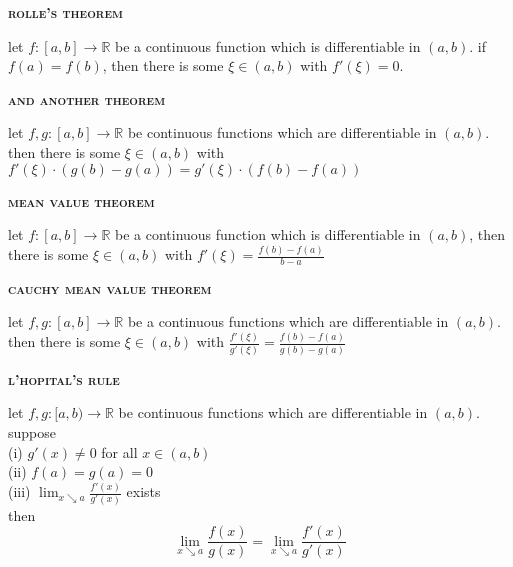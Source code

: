 \documentclass[a4paper]{article}
\begin{document}
\begin{multicols}{2}
\begin{framed}
	\begin{center}
		\textbf{\textsc{rolle's theorem}}
	\end{center}
	let $f:[a,b] \rightarrow \mathbb{R}$ be a continuous function which is differentiable in $(a,b)$. if
$f(a) = f(b)$, then there is some $\xi \in (a,b)$ with $f'(\xi) = 0$.
\end{framed}

\begin{framed}
	\begin{center}
		\textbf{\textsc{and another theorem}}
	\end{center}
	let $f,g: [a,b] \rightarrow \mathbb{R}$ be continuous functions which are differentiable in $(a, b)$. then there is some $\xi \in (a, b)$ with
	$f′(\xi) \cdot (g(b) − g(a)) = g′(\xi) \cdot (f(b) − f(a))$
\end{framed}

\begin{framed}
	\begin{center}
		\textbf{\textsc{mean value theorem}}
	\end{center}
	let $f:[a, b] \rightarrow \mathbb{R}$ be a continuous function which is differentiable in $(a, b)$, then there is some $\xi \in (a, b)$ with $f'(\xi) = \frac{f(b) - f(a)}{b - a}$
\end{framed}

\begin{framed}
	\begin{center}
		\textbf{\textsc{cauchy mean value theorem}}
	\end{center}
	let $f,g :[a, b] \rightarrow \mathbb{R}$ be a continuous functions which are differentiable in $(a, b)$. then there is some $\xi \in (a, b)$ with $\frac{f'(\xi)}{g'(\xi)} = \frac{f(b) - f(a)}{g(b) - g(a)}$
\end{framed}

\begin{framed}
	\begin{center}
		\textbf{\textsc{l'hopital's rule}}
	\end{center}
	let $f,g:[a, b) \rightarrow \mathbb{R}$ be continuous functions which are differentiable in $(a, b)$. suppose\\
	(i) $g'(x) \neq 0$ for all $x \in (a, b)$\\
	(ii) $f(a) = g(a) = 0$\\
	(iii) $\lim_{x \searrow a}\frac{f'(x)}{g'(x)}$ exists\\
	then
	$$\lim_{x \searrow a}\frac{f(x)}{g(x)} = \lim_{x \searrow a}\frac{f'(x)}{g'(x)}$$
	

\end{framed}
\end{multicols}
\end{document}
